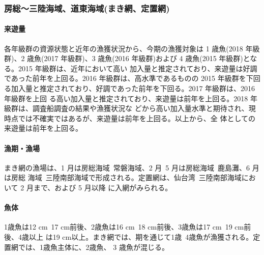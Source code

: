 \documentclass[11pt]{article}
\begin{document}
\subsubsection{房総〜三陸海域、道東海域(まき網、定置網)}
\paragraph{来遊量}
各年級群の資源状態と近年の漁獲状況から、今期の漁獲対象は 1 歳魚(2018 年級群)、2 歳魚(2017
年級群)、3 歳魚(2016 年級群)および 4 歳魚(2015 年級群)となる。2015 年級群は、近年において高い 加入量と推定されており、来遊量は好調であった前年を上回る。2016 年級群は、高水準であるものの 2015 年級群を下回る加入量と推定されており、好調であった前年を下回る。2017 年級群は、2016 年級群を上回 る高い加入量と推定されており、来遊量は前年を上回る。2018 年級群は、調査船調査の結果や漁獲状況な どから高い加入量水準と期待され、現時点では不確実ではあるが、来遊量は前年を上回る。以上から、全 体としての来遊量は前年を上回る。
\paragraph{漁期・漁場}
まき網の漁場は、1 月は房総海域~常磐海域、2 月~5 月は房総海域~鹿島灘、6 月は房総 海域~三陸南部海域で形成される。定置網は、仙台湾~三陸南部海域において 2 月まで、および 5 月以降 に入網がみられる。
\paragraph{魚体}
1歳魚は12 cm~17 cm前後、2歳魚は16 cm~18 cm前後、3歳魚は17 cm~19 cm前後、4歳以上 は19 cm以上。まき網では、期を通じて1歳~4歳魚が漁獲される。定置網では、1歳魚主体に、2歳魚、 3 歳魚が混じる。
\end{document}
